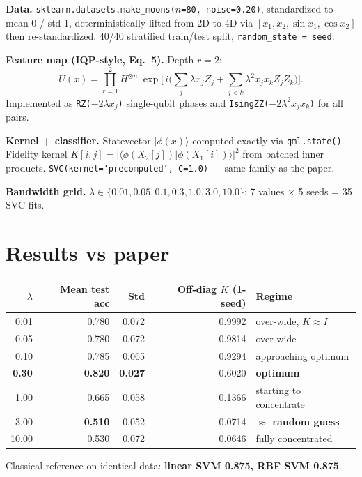 \documentclass[11pt]{article}
\begin{document}
\textbf{Data.} \texttt{sklearn.datasets.make\_moons($n$=80, noise=0.20)}, standardized
to mean 0 / std 1, deterministically lifted from 2D to 4D via
$[x_1, x_2, \sin x_1, \cos x_2]$ then re-standardized. 40/40 stratified train/test
split, \texttt{random\_state = seed}.

\textbf{Feature map (IQP-style, Eq.\ 5).} Depth $r\!=\!2$:
\[
U(x) = \prod_{r=1}^{2} H^{\otimes n}\;
       \exp\!\Big[\, i\!\Big(\sum_j \lambda x_j Z_j
       + \sum_{j<k} \lambda^2 x_j x_k Z_j Z_k \Big) \Big].
\]
Implemented as \texttt{RZ($-2\lambda x_j$)} single-qubit phases and
\texttt{IsingZZ($-2\lambda^2 x_j x_k$)} for all pairs.

\textbf{Kernel + classifier.} Statevector $|\phi(x)\rangle$ computed exactly via
\texttt{qml.state()}. Fidelity kernel $K[i,j] = |\langle \phi(X_2[j]) | \phi(X_1[i]) \rangle|^2$
from batched inner products. \texttt{SVC(kernel='precomputed', C=1.0)} --- same
family as the paper.

\textbf{Bandwidth grid.} $\lambda \in \{0.01, 0.05, 0.1, 0.3, 1.0, 3.0, 10.0\}$;
7 values $\times$ 5 seeds = 35 SVC fits.

\section{Results vs paper}

\begin{center}
\begin{tabular}{rrrrl}
\toprule
$\lambda$ & Mean test acc & Std & Off-diag $K$ (1-seed) & Regime \\
\midrule
0.01  & 0.780 & 0.072 & 0.9992 & over-wide, $K\!\approx\!I$ \\
0.05  & 0.780 & 0.072 & 0.9814 & over-wide \\
0.10  & 0.785 & 0.065 & 0.9294 & approaching optimum \\
\textbf{0.30}  & \textbf{0.820} & \textbf{0.027} & 0.6020 & \textbf{optimum} \\
1.00  & 0.665 & 0.058 & 0.1366 & starting to concentrate \\
3.00  & \textbf{0.510} & 0.052 & 0.0714 & \textbf{$\approx$ random guess} \\
10.00 & 0.530 & 0.072 & 0.0646 & fully concentrated \\
\bottomrule
\end{tabular}
\end{center}

Classical reference on identical data: \textbf{linear SVM 0.875, RBF SVM 0.875}.
\end{document}
